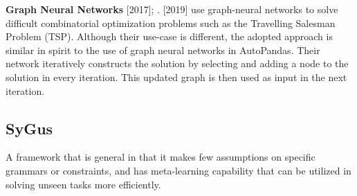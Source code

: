\documentclass{article}
\begin{document}
\textbf{Graph Neural Networks}
\cite{dai2018learning} [2017]; \cite{kool2018attention}. [2019] use graph-neural networks to solve difficult combinatorial optimization problems such as the Travelling Salesman Problem (TSP). Although their use-case is different, the adopted approach is similar in spirit to the use of graph neural networks in AutoPandas. Their network iteratively constructs the solution by selecting and adding a node to the solution in every iteration. This updated graph is then used as input in the next iteration.

\subsection{SyGus}
 A framework that is general in that it makes few assumptions on specific grammars or constraints, and has meta-learning capability that can be utilized in solving unseen tasks more efficiently.
\end{document}
